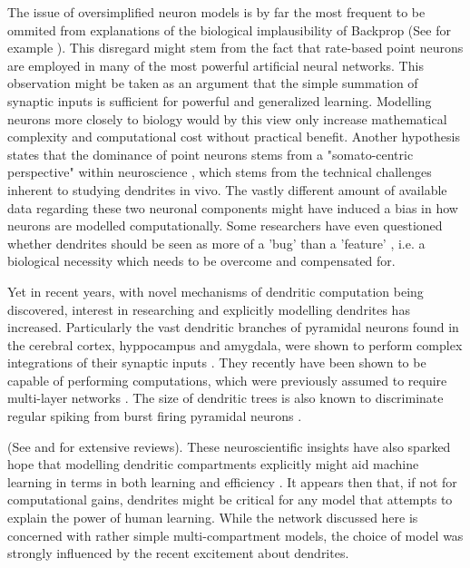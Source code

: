 The issue of oversimplified neuron models is by far the most frequent to be ommited from explanations of the biological
implausibility of Backprop (See for example \citep{Meulemans2020,Lillicrap2014}). This disregard might stem from the
fact that rate-based point neurons are employed in many of the most powerful artificial neural networks. This
observation might be taken as an argument that the simple summation of synaptic inputs is sufficient for powerful and
generalized learning. Modelling neurons more closely to biology would by this view only increase mathematical complexity
and computational cost without practical benefit. Another hypothesis states that the dominance of point neurons stems
from a "somato-centric perspective" within neuroscience \citep{Larkum2018}, which stems from the technical challenges
inherent to studying dendrites in vivo. The vastly different amount of available data regarding these two neuronal
components might have induced a bias in how neurons are modelled computationally. Some researchers have even questioned
whether dendrites should be seen as more of a 'bug' than a 'feature' \citep{Haeusser2003}, i.e. a biological necessity
which needs to be overcome and compensated for.

Yet in recent years, with novel mechanisms of dendritic computation being discovered, interest in researching and
explicitly modelling dendrites has increased. Particularly the vast dendritic branches of pyramidal neurons found in the
cerebral cortex, hyppocampus and amygdala, were shown to perform complex integrations of their synaptic inputs
\citep{spruston2008pyramidal}. They recently have been shown to be capable of performing computations, which were
previously assumed to require multi-layer networks \citep{Schiess2016,Gidon2020}. The size of dendritic trees is also
known to discriminate regular spiking from burst firing pyramidal neurons \citep{Elburg2010}. 

(See \citep{Larkum2022} and \citep{Poirazi2020} for extensive reviews). These neuroscientific insights have also sparked
hope that modelling dendritic compartments explicitly might aid machine learning in terms in both learning and
efficiency \citep{Chavlis2021,guerguiev2017towards,Richards2019,Eyal2018}. It appears then that, if not for
computational gains, dendrites might be critical for any model that attempts to explain the power of human learning.
While the network discussed here is concerned with rather simple multi-compartment models, the choice of model was
strongly influenced by the recent excitement about dendrites.





